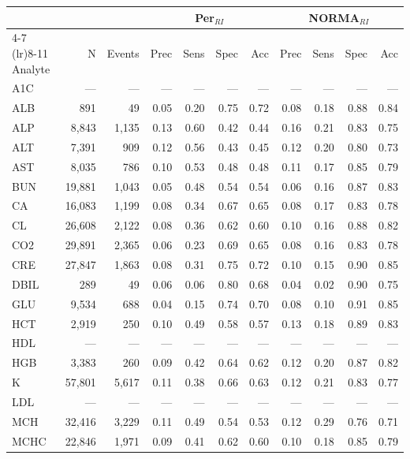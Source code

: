 \begin{table}[ht]
\centering
\footnotesize
\begin{tabular}{lrrrrrrrrrr}
\toprule
 & &  & \multicolumn{4}{c}{Per$_{RI}$} & \multicolumn{4}{c}{NORMA$_{RI}$} \\
\cmidrule(lr){4-7} \cmidrule(lr){8-11}
Analyte & N & Events & Prec & Sens & Spec & Acc & Prec & Sens & Spec & Acc \\
\midrule
A1C & --- & --- & --- & --- & --- & --- & --- & --- & --- & --- \\
ALB & 891 & 49 & 0.05 & 0.20 & 0.75 & 0.72 & 0.08 & 0.18 & 0.88 & 0.84 \\
ALP & 8,843 & 1,135 & 0.13 & 0.60 & 0.42 & 0.44 & 0.16 & 0.21 & 0.83 & 0.75 \\
ALT & 7,391 & 909 & 0.12 & 0.56 & 0.43 & 0.45 & 0.12 & 0.20 & 0.80 & 0.73 \\
AST & 8,035 & 786 & 0.10 & 0.53 & 0.48 & 0.48 & 0.11 & 0.17 & 0.85 & 0.79 \\
BUN & 19,881 & 1,043 & 0.05 & 0.48 & 0.54 & 0.54 & 0.06 & 0.16 & 0.87 & 0.83 \\
CA & 16,083 & 1,199 & 0.08 & 0.34 & 0.67 & 0.65 & 0.08 & 0.17 & 0.83 & 0.78 \\
CL & 26,608 & 2,122 & 0.08 & 0.36 & 0.62 & 0.60 & 0.10 & 0.16 & 0.88 & 0.82 \\
CO2 & 29,891 & 2,365 & 0.06 & 0.23 & 0.69 & 0.65 & 0.08 & 0.16 & 0.83 & 0.78 \\
CRE & 27,847 & 1,863 & 0.08 & 0.31 & 0.75 & 0.72 & 0.10 & 0.15 & 0.90 & 0.85 \\
DBIL & 289 & 49 & 0.06 & 0.06 & 0.80 & 0.68 & 0.04 & 0.02 & 0.90 & 0.75 \\
GLU & 9,534 & 688 & 0.04 & 0.15 & 0.74 & 0.70 & 0.08 & 0.10 & 0.91 & 0.85 \\
HCT & 2,919 & 250 & 0.10 & 0.49 & 0.58 & 0.57 & 0.13 & 0.18 & 0.89 & 0.83 \\
HDL & --- & --- & --- & --- & --- & --- & --- & --- & --- & --- \\
HGB & 3,383 & 260 & 0.09 & 0.42 & 0.64 & 0.62 & 0.12 & 0.20 & 0.87 & 0.82 \\
K & 57,801 & 5,617 & 0.11 & 0.38 & 0.66 & 0.63 & 0.12 & 0.21 & 0.83 & 0.77 \\
LDL & --- & --- & --- & --- & --- & --- & --- & --- & --- & --- \\
MCH & 32,416 & 3,229 & 0.11 & 0.49 & 0.54 & 0.53 & 0.12 & 0.29 & 0.76 & 0.71 \\
MCHC & 22,846 & 1,971 & 0.09 & 0.41 & 0.62 & 0.60 & 0.10 & 0.18 & 0.85 & 0.79 \\

\end{tabular}
\end{table}
